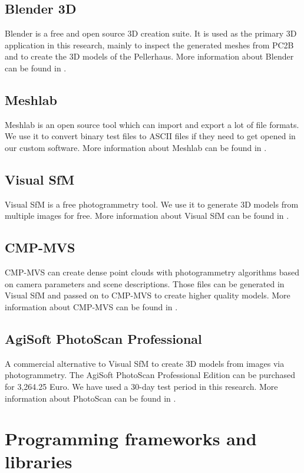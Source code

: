 \subsection{Blender 3D}
Blender is a free and open source 3D creation suite. It is used as the primary 3D application in this research, mainly to inspect the generated meshes from PC2B and to create the 3D models of the Pellerhaus. More information about Blender can be found in \parencite{appendix_blender}.

\subsection{Meshlab}
Meshlab is an open source tool which can import and export a lot of file formats. We use it to convert binary test files to ASCII files if they need to get opened in our custom software. More information about Meshlab can be found in \parencite{appendix_meshlab}.

\subsection{Visual SfM}
\label{appendix_visual_sfm}
Visual SfM is a free photogrammetry tool. We use it to generate 3D models from multiple images for free. More information about Visual SfM can be found in \parencite{appendix_visualsfm}.

\subsection{CMP-MVS}
CMP-MVS can create dense point clouds with photogrammetry algorithms based on camera parameters and scene descriptions. Those files can be generated in Visual SfM and passed on to CMP-MVS to create higher quality models. More information about CMP-MVS can be found in \parencite{appendix_cmp-mvs}.

\subsection{AgiSoft PhotoScan Professional}
A commercial alternative to Visual SfM to create 3D models from images via photogrammetry. The AgiSoft PhotoScan Professional Edition can be purchased for 3,264.25 Euro. We have used a 30-day test period in this research. More information about PhotoScan can be found in \parencite{appendix_agisoft_photoscan}.


\section{Programming frameworks and libraries}

